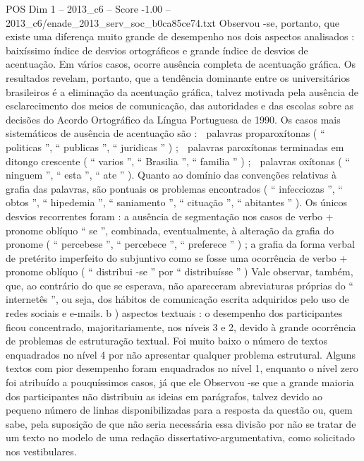 \begin{textsample}{POS Dim 1 – 2013\_c6 – Score -1.00 – 2013\_c6/enade\_2013\_serv\_soc\_b0ca85ce74.txt}
Observou -se, portanto, que existe uma diferença muito grande de desempenho nos dois aspectos analisados : baixíssimo índice de desvios ortográficos e grande índice de desvios de acentuação.
Em vários casos, ocorre ausência completa de acentuação gráfica.
Os resultados revelam, portanto, que a tendência dominante entre os universitários brasileiros é a eliminação da acentuação gráfica, talvez motivada pela ausência de esclarecimento dos meios de comunicação, das autoridades e das escolas sobre as decisões do Acordo Ortográfico da Língua Portuguesa de 1990.
Os casos mais sistemáticos de ausência de acentuação são :  palavras proparoxítonas ( “ politicas ”, “ publicas ”, “ juridicas ” ) ;  palavras paroxítonas terminadas em ditongo crescente ( “ varios ”, “ Brasilia ”, “ familia ” ) ;  palavras oxítonas ( “ ninguem ”, “ esta ”, “ ate ” ).
Quanto ao domínio das convenções relativas à grafia das palavras, são pontuais os problemas encontrados ( “ infecciozas ”, “ obtos ”, “ hipedemia ”, “ saniamento ”, “ cituação ”, “ abitantes ” ).
Os únicos desvios recorrentes foram : a ausência de segmentação nos casos de verbo + pronome oblíquo “ se ”, combinada, eventualmente, à alteração da grafia do pronome ( “ percebese ”, “ percebece ”, “ preferece ” ) ; a grafia da forma verbal de pretérito imperfeito do subjuntivo como se fosse uma ocorrência de verbo + pronome oblíquo ( “ distribui -se ” por “ distribuísse ” ) Vale observar, também, que, ao contrário do que se esperava, não apareceram abreviaturas próprias do “ internetês ”, ou seja, dos hábitos de comunicação escrita adquiridos pelo uso de redes sociais e e-mails. b ) aspectos textuais : o desempenho dos participantes ficou concentrado, majoritariamente, nos níveis 3 e 2, devido à grande ocorrência de problemas de estruturação textual.
Foi muito baixo o número de textos enquadrados no nível 4 por não apresentar qualquer problema estrutural.
Alguns textos com pior desempenho foram enquadrados no nível 1, enquanto o nível zero foi atribuído a pouquíssimos casos, já que ele Observou -se que a grande maioria dos participantes não distribuiu as ideias em parágrafos, talvez devido ao pequeno número de linhas disponibilizadas para a resposta da questão ou, quem sabe, pela suposição de que não seria necessária essa divisão por não se tratar de um texto no modelo de uma redação dissertativo-argumentativa, como solicitado nos vestibulares.

\end{textsample}
